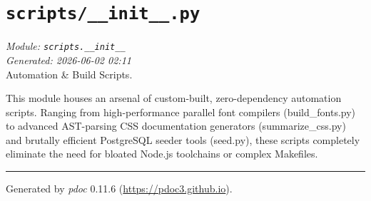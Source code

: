 
\section{\texttt{scripts/\_\_init\_\_.py}}
\textit{Module: \texttt{scripts.\_\_init\_\_}} \\
\textit{Generated: 2026-06-02 02:11} \\

Automation \& Build Scripts.

This module houses an arsenal of custom-built, zero-dependency
automation scripts. Ranging from high-performance parallel font
compilers (build\_fonts.py) to advanced AST-parsing CSS documentation
generators (summarize\_css.py) and brutally efficient PostgreSQL seeder
tools (seed.py), these scripts completely eliminate the need for bloated
Node.js toolchains or complex Makefiles.

\begin{center}\rule{0.5\linewidth}{0.5pt}
\end{center}

Generated by \emph{pdoc} 0.11.6 (\url{https://pdoc3.github.io}).
